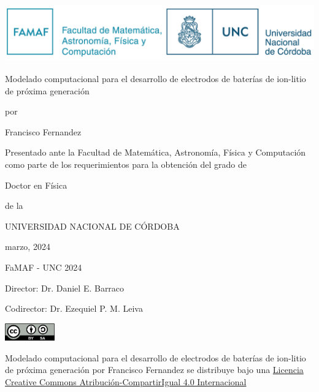 \thispagestyle{empty}
\begin{center}
{\large
    \includegraphics[height=2.5cm]{Caratula/logo.png}

    \vspace{1cm}

    {\Huge Modelado computacional para el desarrollo de electrodos de baterías de ion-litio de próxima generación}
    
    \vspace{0.5cm}
    por
    \vspace{0.5cm}
    
    {\Large Francisco Fernandez}

    \vspace{0.5cm}

    Presentado ante la Facultad de Matemática, Astronomía, Física y Computación 
    como parte de los requerimientos para la obtención del grado de
    
    \vspace{0.5cm}

    {\Large Doctor en Física}

    \vspace{0.5cm}
    de la

    UNIVERSIDAD NACIONAL DE CÓRDOBA

    \vspace{0.5cm}
    
    marzo, 2024

    \textcopyright FaMAF - UNC 2024

    \vspace{1.5cm}

    Director: Dr. Daniel E. Barraco 

    Codirector: Dr. Ezequiel P. M. Leiva

    \vspace{1.5cm}
    \href{https://creativecommons.org/licenses/by-sa/4.0/deed.es}{
        \includegraphics[height=0.75cm]{Caratula/cc-by-sa.png}
    }

    {\footnotesize 
    Modelado computacional para el desarrollo de electrodos de baterías de 
    ion-litio de próxima generación por Francisco Fernandez se distribuye bajo una 
    \href{https://creativecommons.org/licenses/by-sa/4.0/deed.es}{Licencia 
    Creative Commons Atribución-CompartirIgual 4.0 Internacional}
    }
}
\end{center}

